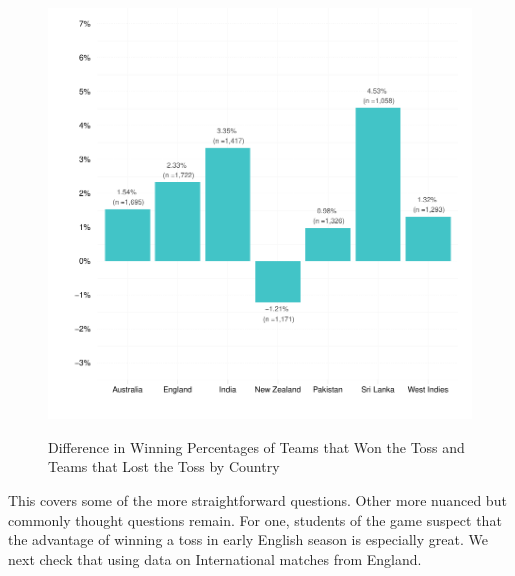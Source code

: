 \documentclass[12pt]{article}
\begin{document}
\begin{figure}[htbp]
\centering
\caption{Difference in Winning Percentages of Teams that Won the Toss and Teams that Lost the Toss by Country}
\includegraphics[scale=.85]{../figs/winbyCountry.pdf}
\label{fig:country}
\end{figure}

This covers some of the more straightforward questions. Other more nuanced but commonly thought questions remain. For one, students of the game suspect that the advantage of winning a toss in early English season is especially great. We next check that using data on International matches from England. 
\end{document}
